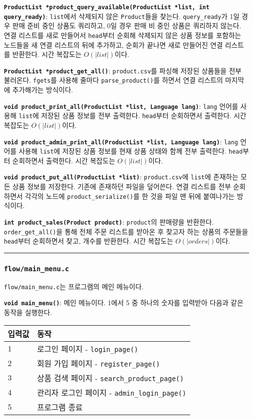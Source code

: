 \documentclass[runningheads]{llncs}
\begin{document}
\textbf{\texttt{ProductList *product_query_available(ProductList *list, int query_ready)}}: \texttt{list}에서 삭제되지 않은 \texttt{Product}들을 찾는다. \texttt{query_ready}가 1일 경우 판매 준비 중인 상품도 쿼리하고, 0일 경우 판매 비 중인 상품은 쿼리하지 않는다. 연결 리스트를 새로 만들어서 \texttt{head}부터 순회해 삭제되지 않은 상품 정보를 포함하는 노드들을 새 연결 리스트의 뒤에 추가하고, 순회가 끝나면 새로 만들어진 연결 리스트를 반환한다. 시간 복잡도는 $O(\left|list\right|)$이다.

\textbf{\texttt{ProductList *product_get_all()}}: \texttt{product.csv}를 파싱해 저장된 상품들을 전부 불러온다. \texttt{fgets}를 사용해 줄마다 \texttt{parse_product()}를 하면서 연결 리스트의 마지막에 추가해가는 방식이다.

\textbf{\texttt{void product_print_all(ProductList *list, Language lang)}}: \texttt{lang} 언어를 사용해 \texttt{list}에 저장된 상품 정보를 전부 출력한다. \texttt{head}부터 순회하면서 출력한다. 시간 복잡도는 $O(\left|list\right|)$이다.

\textbf{\texttt{void product_admin_print_all(ProductList *list, Language lang)}}: \texttt{lang} 언어를 사용해 \texttt{list}에 저장된 상품 정보를 현재 상품 상태와 함께 전부 출력한다. \texttt{head}부터 순회하면서 출력한다. 시간 복잡도는 $O(\left|list\right|)$이다.

\textbf{\texttt{void product_put_all(ProductList *list)}}: \texttt{product.csv}에 \texttt{list}에 존재하는 모든 상품 정보를 저장한다. 기존에 존재하던 파일을 덮어쓴다. 연결 리스트를 전부 순회하면서 각각의 노드에 \texttt{product_serialize()}를 한 것을 파일 맨 뒤에 붙여나가는 방식이다.

\textbf{\texttt{int product_sales(Product product)}}: \texttt{product}의 판매량을 반환한다. \texttt{order_get_all()}을 통해 전체 주문 리스트를 받아온 후 찾고자 하는 상품의 주문들을 \texttt{head}부터 순회하면서 찾고, 개수를 반환한다. 시간 복잡도는 $O(\left|orders\right|)$이다.

\noindent\rule{2cm}{0.4pt}

\subsubsection{\texttt{flow/main_menu.c}}
\texttt{flow/main_menu.c}는 프로그램의 메인 메뉴이다.

\textbf{\texttt{void main_menu()}}: 메인 메뉴이다. 1에서 5 중 하나의 숫자를 입력받아 다음과 같은 동작을 실행한다.

\begin{tabularx}{\textwidth}{l|X}
	\hline
		입력값	& 동작 \\
	\hline
		1 & 로그인 페이지 - \texttt{login_page()} \\
		2 & 회원 가입 페이지 - \texttt{register_page()} \\
		3 & 상품 검색 페이지 - \texttt{search_product_page()} \\
		4 & 관리자 로그인 페이지 - \texttt{admin_login_page()} \\
		5 & 프로그램 종료 \\
	\hline
\end{tabularx}
\end{document}

